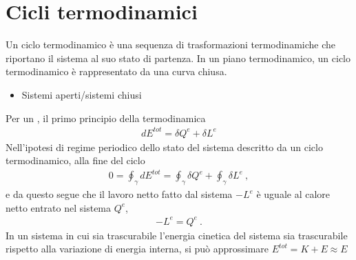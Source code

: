 \documentclass[letterpaper,10pt,italian]{jupyterBook}
\begin{document}
\sphinxstepscope


\section{Cicli termodinamici}
\label{\detokenize{ch/thermodynamics/heat-engine-td-cycles:cicli-termodinamici}}\label{\detokenize{ch/thermodynamics/heat-engine-td-cycles:physics-hs-thermodynamics-heat-engine-td-cycles}}\label{\detokenize{ch/thermodynamics/heat-engine-td-cycles::doc}}
\sphinxAtStartPar
Un ciclo termodinamico è una sequenza di trasformazioni termodinamiche che riportano il sistema al suo stato di partenza.
In un piano termodinamico, un ciclo termodinamico è rappresentato da una curva chiusa.
\begin{itemize}
\item {} 
\sphinxAtStartPar
{} Sistemi aperti/sistemi chiusi

\end{itemize}

\sphinxAtStartPar
Per un , il primo principio della termodinamica
\begin{equation*}
\begin{split}d E^{tot} = \delta Q^e + \delta L^e\end{split}
\end{equation*}
\sphinxAtStartPar
Nell’ipotesi di regime periodico dello stato del sistema descritto da un ciclo termodinamico, alla fine del ciclo
\begin{equation*}
\begin{split}0 =  \oint_\gamma d E^{tot} = \oint_\gamma \delta Q^e + \oint_\gamma \delta L^e \ ,\end{split}
\end{equation*}
\sphinxAtStartPar
e da questo segue che il lavoro netto fatto dal sistema \(-L^e\) è uguale al calore netto entrato nel sistema \(Q^e\),
\begin{equation*}
\begin{split}-L^e = Q^e \ .\end{split}
\end{equation*}
\sphinxAtStartPar
{} In un sistema in cui sia trascurabile l’energia cinetica del sistema sia trascurabile rispetto alla variazione di energia interna, si può approssimare \(E^{tot} = K + E \approx E\)

\sphinxstepscope
\end{document}
